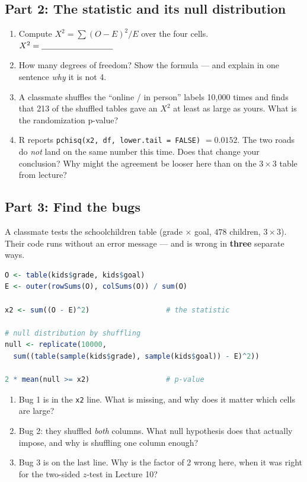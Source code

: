 \documentclass{article}
\newcommand{\blankline}[1]{\underline{\hspace{#1}}}
\begin{document}
\subsection*{Part 2: The statistic and its null distribution}

\begin{enumerate}[label={\bfseries (\Alph*)},itemsep=.8em]
\item Compute $X^2 = \sum (O-E)^2/E$ over the four cells. \hfill $X^2 = \blankline{1.2in}$ \\[2em]
\item How many degrees of freedom? Show the formula --- and explain in one sentence \emph{why} it is not 4. \\[3.5em]
\item A classmate shuffles the ``online / in person'' labels 10{,}000 times and finds that 213 of the shuffled tables gave an $X^2$ at least as large as yours. What is the randomization p-value? \hfill \blankline{1.2in} \\[1.5em]
\item R reports \texttt{pchisq(x2, df, lower.tail = FALSE)} $= 0.0152$. The two roads do \emph{not} land on the same number this time. Does that change your conclusion? Why might the agreement be looser here than on the $3\times3$ table from lecture? \\[4.5em]
\end{enumerate}

\newpage

\subsection*{Part 3: Find the bugs}
A classmate tests the schoolchildren table (grade $\times$ goal, $478$ children, $3 \times 3$). Their code runs without an error message --- and is wrong in \textbf{three} separate ways.

\begin{lstlisting}[language=R]
O <- table(kids$grade, kids$goal)
E <- outer(rowSums(O), colSums(O)) / sum(O)

x2 <- sum((O - E)^2)                  # the statistic

# null distribution by shuffling
null <- replicate(10000,
  sum((table(sample(kids$grade), sample(kids$goal)) - E)^2))

2 * mean(null >= x2)                  # p-value
\end{lstlisting}

\begin{enumerate}[label={\bfseries (\Alph*)},itemsep=.8em]
\item Bug 1 is in the \texttt{x2} line. What is missing, and why does it matter which cells are large? \\[3.5em]
\item Bug 2: they shuffled \emph{both} columns. What null hypothesis does that actually impose, and why is shuffling one column enough? \\[4em]
\item Bug 3 is on the last line. Why is the factor of 2 wrong here, when it was right for the two-sided $z$-test in Lecture 10? \\[3.5em]
\end{enumerate}
\end{document}
